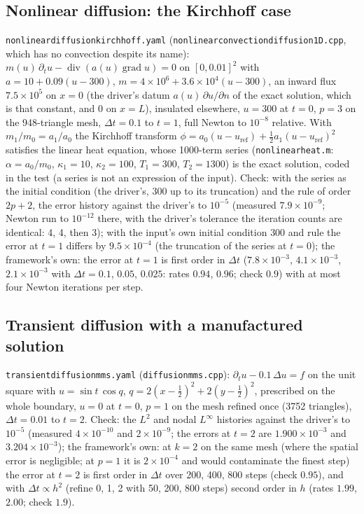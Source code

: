 \documentclass[11pt]{article}
\newcommand{\grad}{\operatorname{grad}}
\newcommand{\dive}{\operatorname{div}}
\DeclareRobustCommand{\file}[1]{{\def\_{\textunderscore\allowbreak}\texttt{#1}}}
\begin{document}
\subsection{Nonlinear diffusion: the Kirchhoff case}
\file{nonlinear\_diffusion\_kirchhoff.yaml} (\file{nonlinear\_convection\_diffusion\_1D.cpp},
which has no convection despite its name): $m(u)\,\partial_t u - \dive(a(u)\grad u) = 0$
on $[0, 0.01]^2$ with $a = 10 + 0.09(u - 300)$, $m = 4\times10^6 + 3.6\times10^4(u - 300)$,
an inward flux $7.5\times10^5$ on $x = 0$ (the driver's datum $a(u)\,\partial u/\partial n$
of the exact solution, which is that constant, and $0$ on $x = L$),
insulated elsewhere, $u = 300$ at $t = 0$, $p = 3$ on the 948-triangle mesh,
$\Delta t = 0.1$ to $t = 1$, full Newton to $10^{-8}$ relative.  With
$m_1/m_0 = a_1/a_0$ the Kirchhoff transform $\phi = a_0(u - u_{\mathrm{ref}}) + \tfrac12 a_1(u - u_{\mathrm{ref}})^2$
satisfies the linear heat equation, whose 1000-term series
(\file{nonlinear\_heat.m}: $\alpha = a_0/m_0$, $\kappa_1 = 10$, $\kappa_2 = 100$,
$T_1 = 300$, $T_2 = 1300$) is the exact solution, coded in the test (a
series is not an expression of the input).  Check: with the series as the
initial condition (the driver's, $300$ up to its truncation) and the rule
of order $2p + 2$, the error history against the driver's to $10^{-5}$
(measured $7.9\times10^{-9}$; Newton run to $10^{-12}$ there, with the
driver's tolerance the iteration counts are identical: 4, 4, then 3); with
the input's own initial condition $300$ and rule the error at $t = 1$
differs by $9.5\times10^{-4}$ (the truncation of the series at $t = 0$);
the framework's own: the error at $t = 1$ is first order in $\Delta t$
($7.8\times10^{-3}$, $4.1\times10^{-3}$, $2.1\times10^{-3}$ with $\Delta t = 0.1$,
$0.05$, $0.025$: rates $0.94$, $0.96$; check $0.9$) with at most four Newton
iterations per step.

\subsection{Transient diffusion with a manufactured solution}
\file{transient\_diffusion\_mms.yaml} (\file{diffusion\_mms.cpp}):
$\partial_t u - 0.1\,\Delta u = f$ on the unit square with
$u = \sin t\,\cos q$, $q = 2(x - \tfrac12)^2 + 2(y - \tfrac12)^2$, prescribed
on the whole boundary, $u = 0$ at $t = 0$, $p = 1$ on the mesh refined once
(3752 triangles), $\Delta t = 0.01$ to $t = 2$.  Check: the $L^2$ and nodal
$L^\infty$ histories against the driver's to $10^{-5}$ (measured
$4\times10^{-10}$ and $2\times10^{-9}$; the errors at $t = 2$ are
$1.900\times10^{-3}$ and $3.204\times10^{-3}$); the framework's own: at
$k = 2$ on the same mesh (where the spatial error is negligible; at $p = 1$
it is $2\times10^{-4}$ and would contaminate the finest step) the error at
$t = 2$ is first order in $\Delta t$ over 200, 400, 800 steps (check
$0.95$), and with $\Delta t \propto h^2$ (refine 0, 1, 2 with 50, 200, 800
steps) second order in $h$ (rates $1.99$, $2.00$; check $1.9$).
\end{document}
